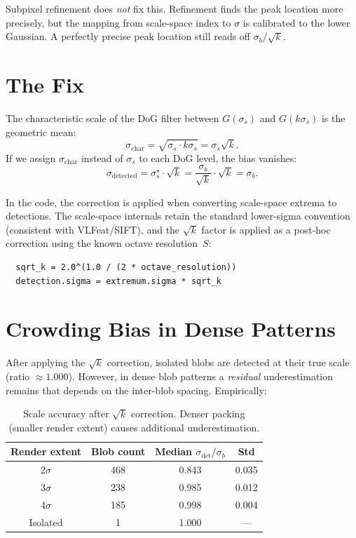 \documentclass[11pt]{article}
\begin{document}
\noindent
Subpixel refinement does \emph{not} fix this.  Refinement finds the peak
location more precisely, but the mapping from scale-space index to
$\sigma$ is calibrated to the lower Gaussian.  A perfectly precise peak
location still reads off $\sigma_b / \sqrt{k}$.

\section{The Fix}

The characteristic scale of the DoG filter between $G(\sigma_s)$ and
$G(k\sigma_s)$ is the geometric mean:
\begin{equation}
  \sigma_{\text{char}} = \sqrt{\sigma_s \cdot k\sigma_s} = \sigma_s\sqrt{k}.
\end{equation}
If we assign $\sigma_{\text{char}}$ instead of $\sigma_s$ to each DoG
level, the bias vanishes:
\begin{equation}
  \sigma_{\text{detected}} = \sigma_s^\star \cdot \sqrt{k}
    = \frac{\sigma_b}{\sqrt{k}} \cdot \sqrt{k} = \sigma_b.
\end{equation}

In the code, the correction is applied when converting scale-space extrema
to detections. The scale-space internals retain the standard lower-sigma
convention (consistent with VLFeat/SIFT), and the $\sqrt{k}$ factor is
applied as a post-hoc correction using the known octave resolution~$S$:
\begin{verbatim}
  sqrt_k = 2.0^(1.0 / (2 * octave_resolution))
  detection.sigma = extremum.sigma * sqrt_k
\end{verbatim}

\section{Crowding Bias in Dense Patterns}

After applying the $\sqrt{k}$ correction, isolated blobs are detected at
their true scale (ratio $\approx 1.000$). However, in dense blob patterns
a \emph{residual} underestimation remains that depends on the inter-blob
spacing.  Empirically:

\begin{table}[h]
\centering
\begin{tabular}{@{}cccc@{}}
\toprule
Render extent & Blob count & Median $\sigma_{\det}/\sigma_b$ & Std \\
\midrule
$2\sigma$ & 468 & 0.843 & 0.035 \\
$3\sigma$ & 238 & 0.985 & 0.012 \\
$4\sigma$ & 185 & 0.998 & 0.004 \\
Isolated  &   1 & 1.000 & --- \\
\bottomrule
\end{tabular}
\caption{Scale accuracy after $\sqrt{k}$ correction. Denser packing
(smaller render extent) causes additional underestimation.}
\end{table}
\end{document}
